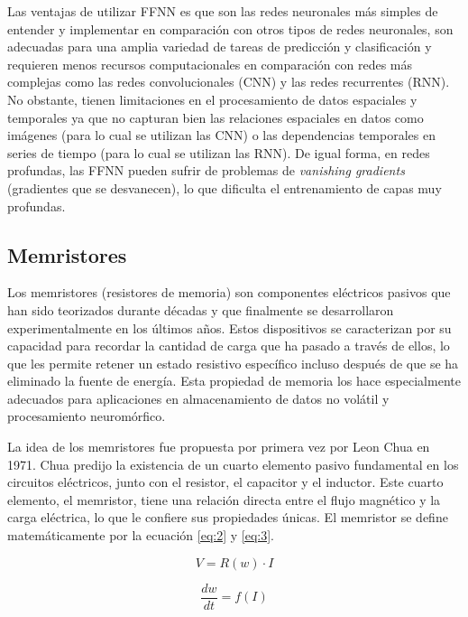 \documentclass[conference]{IEEEtran}
\begin{document}
Las ventajas de utilizar FFNN es que son las redes neuronales más simples de entender y implementar en comparación con otros tipos de redes neuronales, son adecuadas para una amplia variedad de tareas de predicción y clasificación y requieren menos recursos computacionales en comparación con redes más complejas como las redes convolucionales (CNN) y las redes recurrentes (RNN). No obstante, tienen limitaciones en el procesamiento de datos espaciales y temporales ya que no capturan bien las relaciones espaciales en datos como imágenes (para lo cual se utilizan las CNN) o las dependencias temporales en series de tiempo (para lo cual se utilizan las RNN). De igual forma, en redes profundas, las FFNN pueden sufrir de problemas de \textit{vanishing gradients} (gradientes que se desvanecen), lo que dificulta el entrenamiento de capas muy profundas. \cite{mem13}

\subsection{Memristores}
Los memristores (resistores de memoria) son componentes eléctricos pasivos que han sido teorizados durante décadas y que finalmente se desarrollaron experimentalmente en los últimos años. Estos dispositivos se caracterizan por su capacidad para recordar la cantidad de carga que ha pasado a través de ellos, lo que les permite retener un estado resistivo específico incluso después de que se ha eliminado la fuente de energía. Esta propiedad de memoria los hace especialmente adecuados para aplicaciones en almacenamiento de datos no volátil y procesamiento neuromórfico. \cite{HP1}

La idea de los memristores fue propuesta por primera vez por Leon Chua en 1971. \cite{Chua_1971} Chua predijo la existencia de un cuarto elemento pasivo fundamental en los circuitos eléctricos, junto con el resistor, el capacitor y el inductor. Este cuarto elemento, el memristor, tiene una relación directa entre el flujo magnético y la carga eléctrica, lo que le confiere sus propiedades únicas. El memristor se define matemáticamente por la ecuación \ref{eq:2} y \ref{eq:3}.

\begin{equation}
	V = R(w) \cdot I
	\label{eq:2}
\end{equation}

\begin{equation}
	\frac{dw}{dt} = f(I)
	\label{eq:3}
\end{equation}
\end{document}
